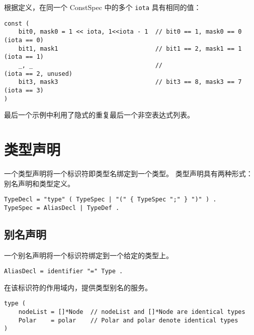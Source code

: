 根据定义，在同一个 ConstSpec 中的多个 \lstinline|iota| 具有相同的值：
\begin{lstlisting}[style=golang]
const (
	bit0, mask0 = 1 << iota, 1<<iota - 1  // bit0 == 1, mask0 == 0  (iota == 0)
	bit1, mask1                           // bit1 == 2, mask1 == 1  (iota == 1)
	_, _                                  //                        (iota == 2, unused)
	bit3, mask3                           // bit3 == 8, mask3 == 7  (iota == 3)
)
\end{lstlisting}
最后一个示例中利用了隐式的重复最后一个非空表达式列表。


\section{类型声明}
一个类型声明将一个标识符即类型名绑定到一个类型。
类型声明具有两种形式：别名声明和类型定义。
\begin{lstlisting}[style=golang]
TypeDecl = "type" ( TypeSpec | "(" { TypeSpec ";" } ")" ) .
TypeSpec = AliasDecl | TypeDef .
\end{lstlisting}

\subsection{别名声明}
一个别名声明将一个标识符绑定到一个给定的类型上。
\begin{lstlisting}[style=EBNF]
AliasDecl = identifier "=" Type .
\end{lstlisting}
在该标识符的作用域内，提供类型别名的服务。
\begin{lstlisting}[style=golang]
type (
	nodeList = []*Node  // nodeList and []*Node are identical types
	Polar    = polar    // Polar and polar denote identical types
)
\end{lstlisting}






